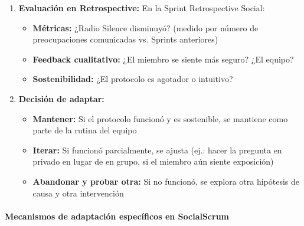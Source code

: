 \begin{enumerate}
\item \textbf{Evaluación en Retrospective:} En la Sprint Retrospective Social:
\begin{itemize}
\item \textbf{Métricas:} ¿Radio Silence disminuyó? (medido por número de preocupaciones comunicadas vs. Sprints anteriores)
\item \textbf{Feedback cualitativo:} ¿El miembro se siente más seguro? ¿El equipo?
\item \textbf{Sostenibilidad:} ¿El protocolo es agotador o intuitivo?
\end{itemize}

\item \textbf{Decisión de adaptar:}
\begin{itemize}
\item \textbf{Mantener:} Si el protocolo funcionó y es sostenible, se mantiene como parte de la rutina del equipo
\item \textbf{Iterar:} Si funcionó parcialmente, se ajusta (ej.: hacer la pregunta en privado en lugar de en grupo, si el miembro aún siente exposición)
\item \textbf{Abandonar y probar otra:} Si no funcionó, se explora otra hipótesis de causa y otra intervención
\end{itemize}

\end{enumerate}

\paragraph{Mecanismos de adaptación específicos en SocialScrum}

